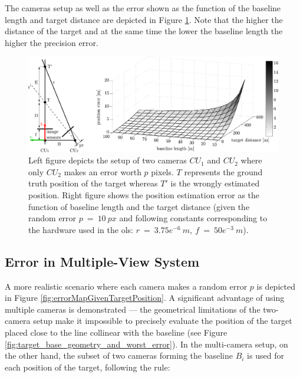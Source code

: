 The cameras setup as well as the error shown as the function of the baseline length and target distance are depicted in Figure \ref{fig:errorGivenBaseAndDistance}. Note that the higher the distance of the target and at the same time the lower the baseline length the higher the precision error.

\begin{figure}[htb]\centering
	\centering
	\includegraphics[width=0.9\linewidth]{fig/error_2_units_baseline_distance}
	\caption{Left figure depicts the setup of two cameras $CU_{1}$ and $CU_{2}$ where only $CU_{2}$ makes an error worth $p$ pixels. $T$ represents the ground truth position of the target whereas $T'$ is the wrongly estimated position. Right figure shows the position estimation error as the function of baseline length and the target distance (given the random error $p~=~10~px$ and following constants corresponding to the hardware used in the \gls{ols}: $r~=~3.75e^{-6}~m,\ f~=~50e^{-3}~m$).}
	\label{fig:errorGivenBaseAndDistance}
\end{figure}

\subsection{Error in Multiple-View System}

A more realistic scenario where each camera makes a random error $p$ is depicted in Figure \ref{fig:errorMapGivenTargetPosition}. A significant advantage of using multiple cameras is demonstrated --- the geometrical limitations of the two-camera setup make it impossible to precisely evaluate the position of the target placed close to the line collinear with the baseline (see Figure \ref{fig:target_base_geometry_and_worst_error}). In the multi-camera setup, on the other hand, the subset of two cameras forming the baseline $B_{i}$ is used for each position of the target, following the rule: 


